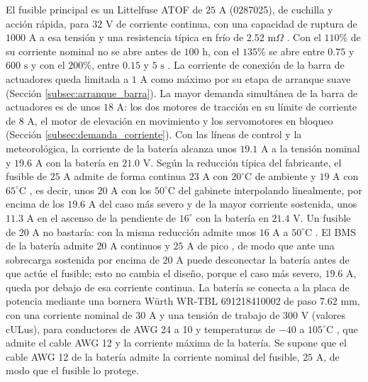 \documentclass[../../General.tex]{subfiles}
\begin{document}
El fusible principal es un Littelfuse ATOF de $25\text{ A}$ (0287025), de cuchilla y acción rápida, para $32\text{ V}$ de corriente continua, con una capacidad de ruptura de $1000\text{ A}$ a esa tensión y una resistencia típica en frío de $2.52\text{ m}\Omega$ \citep{littelfuse_atof}. Con el $110\%$ de su corriente nominal no se abre antes de $100\text{ h}$, con el $135\%$ se abre entre $0.75$ y $600\text{ s}$ y con el $200\%$, entre $0.15$ y $5\text{ s}$ \citep{littelfuse_atof}. La corriente de conexión de la barra de actuadores queda limitada a $1\text{ A}$ como máximo por su etapa de arranque suave (Sección \ref{subsec:arranque_barra}). La mayor demanda simultánea de la barra de actuadores es de unos $18\text{ A}$: los dos motores de tracción en su límite de corriente de $8\text{ A}$, el motor de elevación en movimiento y los servomotores en bloqueo (Sección \ref{subsec:demanda_corriente}). Con las líneas de control y la meteorológica, la corriente de la batería alcanza unos $19.1\text{ A}$ a la tensión nominal y $19.6\text{ A}$ con la batería en $21.0\text{ V}$. Según la reducción típica del fabricante, el fusible de $25\text{ A}$ admite de forma continua $23\text{ A}$ con $20^\circ\text{C}$ de ambiente y $19\text{ A}$ con $65^\circ\text{C}$ \citep{littelfuse_atof}, es decir, unos $20\text{ A}$ con los $50^\circ\text{C}$ del gabinete interpolando linealmente, por encima de los $19.6\text{ A}$ del caso más severo y de la mayor corriente sostenida, unos $11.3\text{ A}$ en el ascenso de la pendiente de $16^\circ$ con la batería en $21.4\text{ V}$. Un fusible de $20\text{ A}$ no bastaría: con la misma reducción admite unos $16\text{ A}$ a $50^\circ\text{C}$ \citep{littelfuse_atof}. El BMS de la batería admite $20\text{ A}$ continuos y $25\text{ A}$ de pico \citep{cmbatteries_7s3p}, de modo que ante una sobrecarga sostenida por encima de $20\text{ A}$ puede desconectar la batería antes de que actúe el fusible; esto no cambia el diseño, porque el caso más severo, $19.6\text{ A}$, queda por debajo de esa corriente continua. La batería se conecta a la placa de potencia mediante una bornera Würth WR-TBL 691218410002 de paso $7.62\text{ mm}$, con una corriente nominal de $30\text{ A}$ y una tensión de trabajo de $300\text{ V}$ (valores cULus), para conductores de AWG 24 a 10 y temperaturas de $-40$ a $105^\circ\text{C}$ \citep{wurth_691218410002}, que admite el cable AWG 12 y la corriente máxima de la batería. Se supone que el cable AWG 12 de la batería admite la corriente nominal del fusible, $25\text{ A}$, de modo que el fusible lo protege.
\end{document}
